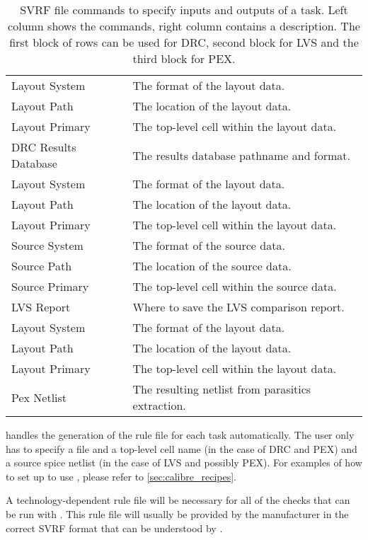 \begin{table}[ht]
	\begin{center}
\begin{tabular}{l|l}
Layout System & The format of the layout data.\\
Layout Path & The location of the layout data.\\
Layout Primary & The top-level cell within the layout data.\\
DRC Results Database & The results database pathname and format.\\
\hline
Layout System & The format of the layout data.\\
Layout Path & The location of the layout data.\\
Layout Primary & The top-level cell within the layout data.\\
Source System & The format of the source data.\\
Source Path & The location of the source data.\\
Source Primary & The top-level cell within the source data.\\
LVS Report & Where to save the LVS comparison report.\\
\hline
Layout System & The format of the layout data.\\
Layout Path & The location of the layout data.\\
Layout Primary & The top-level cell within the layout data.\\
Pex Netlist & The resulting netlist from parasitics extraction.
\end{tabular}
\caption{\gls{SVRF} file commands to specify inputs and outputs of a
 task. Left column shows the commands, right column contains a
description. The first block of rows can be used for \gls{DRC}, second block
for \gls{LVS} and the third block for \gls{PEX}.}
\label{tab:svrf}
	\end{center}
\end{table}

 handles the generation of the rule file for each task automatically.
The user only has to specify a  file and a top-level cell name (in
the case of \gls{DRC} and \gls{PEX}) and a source \gls{spice} netlist (in the
case of \gls{LVS} and possibly \gls{PEX}). For examples of how to set up
 to use , please refer to \cref{sec:calibre_recipes}.

A technology-dependent rule file will be necessary for all of the checks that
can be run with . This rule file will usually be provided by the
manufacturer in the correct \gls{SVRF} format that can be understood by
.

